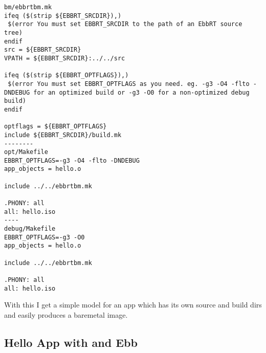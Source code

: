 \documentclass[11pt]{report}
\begin{document}
\begin{verbatim}
bm/ebbrtbm.mk
ifeq ($(strip ${EBBRT_SRCDIR}),)
 $(error You must set EBBRT_SRCDIR to the path of an EbbRT source tree)
endif
src = ${EBBRT_SRCDIR}
VPATH = ${EBBRT_SRCDIR}:../../src

ifeq ($(strip ${EBBRT_OPTFLAGS}),)
 $(error You must set EBBRT_OPTFLAGS as you need. eg. -g3 -O4 -flto -DNDEBUG for an optimized build or -g3 -O0 for a non-optimized debug build)
endif

optflags = ${EBBRT_OPTFLAGS}
include ${EBBRT_SRCDIR}/build.mk
--------
opt/Makefile
EBBRT_OPTFLAGS=-g3 -O4 -flto -DNDEBUG
app_objects = hello.o

include ../../ebbrtbm.mk

.PHONY: all
all: hello.iso
----
debug/Makefile
EBBRT_OPTFLAGS=-g3 -O0
app_objects = hello.o

include ../../ebbrtbm.mk

.PHONY: all
all: hello.iso
\end{verbatim}

With this I get a simple model for an app which has its own source and build dirs
and easily produces a baremetal image.

\subsection{Hello App with and Ebb}







 
\end{document}
